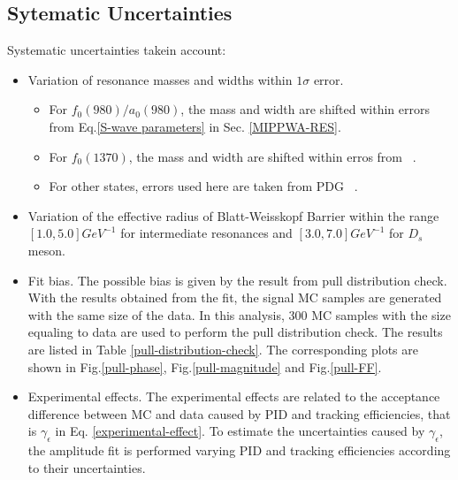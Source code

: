 \subsection{Sytematic Uncertainties}
\par{
    Systematic uncertainties takein account:
    \begin{itemize}
        \item \uppercase\expandafter{} Variation of resonance masses and widths within $1\sigma$ error.
            \begin{itemize}
                \item For $f_{0}(980) /a_{0}(980)$, the mass and width are shifted within errors from Eq.\ref{S-wave parameters} in Sec. \ref{MIPPWA-RES}.
                \item For $f_{0}(1370)$, the mass and width are shifted within erros from ~\cite{para-f01370}.
                \item For other states, errors used here are taken from PDG ~\cite{PDG2018}.
            \end{itemize}
        \item \uppercase\expandafter{} Variation of the effective radius of Blatt-Weisskopf Barrier within the range $\left[1.0, 5.0\right] GeV^{-1}$ for intermediate resonances and  $\left[3.0, 7.0\right] GeV^{-1}$ for $D_{s}$ meson. 
        \item \uppercase\expandafter{} Fit bias. The possible bias is given by the result from pull distribution check. 
            With the results obtained from the fit, the signal MC samples are generated with the same size of the data. In this analysis, 300 MC samples with the size equaling to data are used to perform the pull distribution check.
            The results are listed in Table \ref{pull-distribution-check}.
            The corresponding plots are shown in Fig.\ref{pull-phase}, Fig.\ref{pull-magnitude} and Fig.\ref{pull-FF}.
        \item \uppercase\expandafter{} Experimental effects. 
            The experimental effects are related to the acceptance difference between MC and data caused by PID and tracking efficiencies, that is $\gamma_{\epsilon}$ in Eq. \ref{experimental-effect}.
            To estimate the uncertainties caused by $\gamma_{\epsilon}$, the amplitude fit is performed varying PID and tracking efficiencies according to their uncertainties.
    \end{itemize}
    
}
